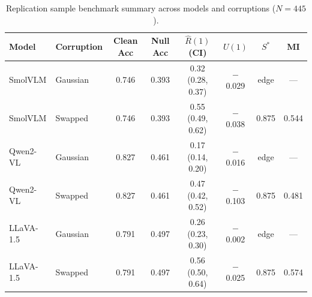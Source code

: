 \begin{table}[t]
\centering
\caption{Replication sample benchmark summary across models and corruptions ($N=445$).}
\label{tab:vlm-rep-summary}
{\footnotesize\setlength{\tabcolsep}{3pt}%
\begin{tabular}{llcccccc}
\toprule
\textbf{Model} & \textbf{Corruption} & Clean Acc & Null Acc & $\hat{R}(1)$ (CI) & $U(1)$ & $S^*$ & MI \\
\midrule
SmolVLM   & Gaussian & 0.746 & 0.393 & 0.32 (0.28, 0.37) & $-$0.029 & edge & --- \\
SmolVLM   & Swapped  & 0.746 & 0.393 & 0.55 (0.49, 0.62) & $-$0.038 & 0.875 & 0.544 \\
Qwen2-VL  & Gaussian & 0.827 & 0.461 & 0.17 (0.14, 0.20) & $-$0.016 & edge & --- \\
Qwen2-VL  & Swapped  & 0.827 & 0.461 & 0.47 (0.42, 0.52) & $-$0.103 & 0.875 & 0.481 \\
LLaVA-1.5 & Gaussian & 0.791 & 0.497 & 0.26 (0.23, 0.30) & $-$0.002 & edge & --- \\
LLaVA-1.5 & Swapped  & 0.791 & 0.497 & 0.56 (0.50, 0.64) & $-$0.025 & 0.875 & 0.574 \\
\bottomrule
\end{tabular}}
\end{table}
